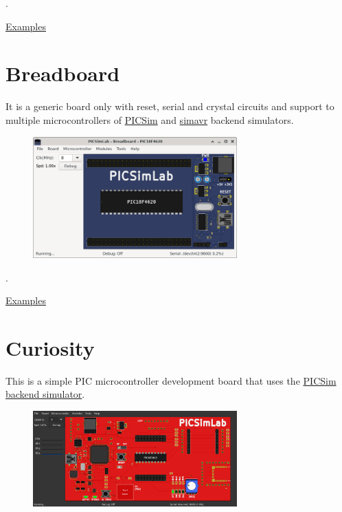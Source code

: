 .\vspace{0.5cm}

\href{https://lcgamboa.github.io/picsimlab_examples/board_Blue_Pill.html}{Examples}


\section{Breadboard}

It is a generic board only with reset, serial and crystal circuits and support to multiple microcontrollers 
of \hyperlink{def:PICSim}{PICSim} and \hyperlink{def:simavr}{simavr} backend simulators.

\begin{figure}[H]
\center
\includegraphics[width=0.7\textwidth]{img/picsimlab0.png} 
\end{figure} 

.\vspace{0.5cm}

\href{https://lcgamboa.github.io/picsimlab_examples/board_Breadboard.html}{Examples}

\section{Curiosity }

This is a simple PIC microcontroller development board that uses the
\hyperlink{def:PICSim}{PICSim backend simulator}.

\begin{figure}[H]
\center
\includegraphics[width=0.7\textwidth]{img/Curiosity.png} 
\end{figure} 

